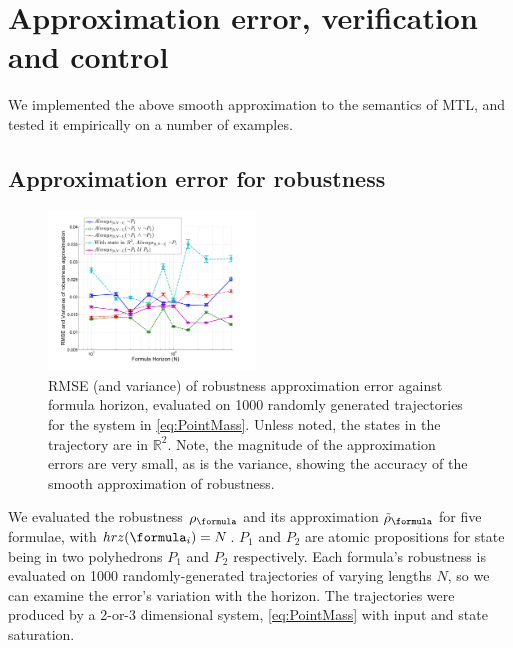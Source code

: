 \section{Approximation error, verification and control}
\label{sec:examples}
We implemented the above smooth approximation to the semantics of MTL, and tested it empirically on a number of examples.

\subsection{Approximation error for robustness}
\label{sec: ex apx error}
\begin{figure}[t]
\centering
\includegraphics[width=0.49\textwidth]{figures/RobustnessError}
\vspace{-30pt}
\caption{{\small RMSE (and variance) of robustness approximation error against formula horizon, evaluated on 1000 randomly generated trajectories for the system in \eqref{eq:PointMass}. Unless noted, the states in the trajectory are in $\mathbb{R}^2$. Note, the magnitude of the approximation errors are very small, as is the variance, showing the accuracy of the smooth approximation of robustness.}}
\vspace{-10pt}
\label{fig:sample result}
\end{figure}

We evaluated the robustness $\robf$ and its approximation $\srobf$ for five formulae, with $hrz(\formula_i) = N$. $P_1$ and $P_2$ are atomic propositions for state being in two polyhedrons $P_1$ and $P_2$ respectively. 
Each formula's robustness is evaluated on 1000 randomly-generated trajectories of varying lengths $N$, so we can  examine the error's variation with the horizon.
The trajectories were produced by a 2-or-3 dimensional system, \eqref{eq:PointMass} with input and state saturation.

